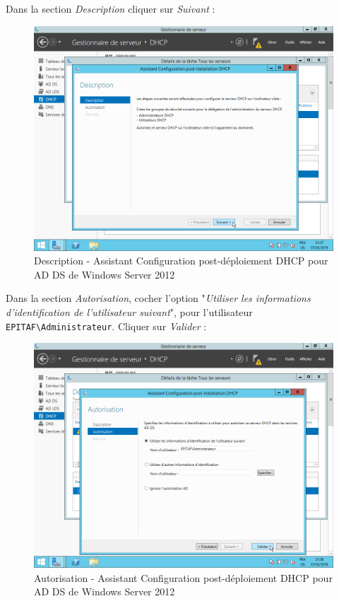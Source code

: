 \newpage
Dans la section \textit{Description} cliquer sur \textit{Suivant} :
\begin{figure}[h!]
    \begin{center}
        \includegraphics[scale=0.6]{WS2012_Screenshots/68.png}
        \caption{Description - Assistant Configuration post-déploiement DHCP pour AD DS de Windows Server 2012}
        \label{WS2012_Screenshots/68}
    \end{center}
\end{figure}
\FloatBarrier

\newpage
Dans la section \textit{Autorisation}, cocher l'option "\textit{Utiliser les informations d'identification de l'utilisateur suivant}", pour l'utilisateur \texttt{EPITAF\textbackslash Administrateur}. Cliquer sur \textit{Valider} :
\begin{figure}[h!]
    \begin{center}
        \includegraphics[scale=0.6]{WS2012_Screenshots/69.png}
        \caption{Autorisation - Assistant Configuration post-déploiement DHCP pour AD DS de Windows Server 2012}
        \label{WS2012_Screenshots/69}
    \end{center}
\end{figure}
\FloatBarrier

